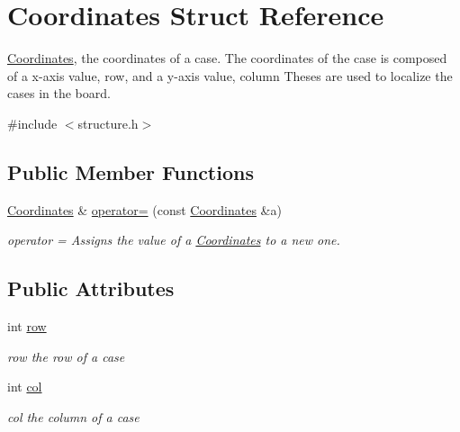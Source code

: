 \hypertarget{struct_coordinates}{}\section{Coordinates Struct Reference}
\label{struct_coordinates}


\hyperlink{struct_coordinates}{Coordinates}, the coordinates of a case. The coordinates of the case is composed of a x-\/axis value, row, and a y-\/axis value, column Theses are used to localize the cases in the board.  




{\ttfamily \#include $<$structure.\+h$>$}

\subsection*{Public Member Functions}
\begin{DoxyCompactItemize}
\item 
\hyperlink{struct_coordinates}{Coordinates} \& \hyperlink{struct_coordinates_a150b9f9ce9574f29bec14407021e7292}{operator=} (const \hyperlink{struct_coordinates}{Coordinates} \&a)
\begin{DoxyCompactList}\small\item\em operator = Assigns the value of a \hyperlink{struct_coordinates}{Coordinates} to a new one. \end{DoxyCompactList}\end{DoxyCompactItemize}
\subsection*{Public Attributes}
\begin{DoxyCompactItemize}
\item 
\mbox{\label{struct_coordinates_aa3e522bbc0eab18fe35a7b17186df35e}} 
int \hyperlink{struct_coordinates_aa3e522bbc0eab18fe35a7b17186df35e}{row}
\begin{DoxyCompactList}\small\item\em row the row of a case \end{DoxyCompactList}\item 
\mbox{\label{struct_coordinates_a4d1e2bdd28dfd0a047e4b1f9fcb04a31}} 
int \hyperlink{struct_coordinates_a4d1e2bdd28dfd0a047e4b1f9fcb04a31}{col}
\begin{DoxyCompactList}\small\item\em col the column of a case \end{DoxyCompactList}\end{DoxyCompactItemize}


